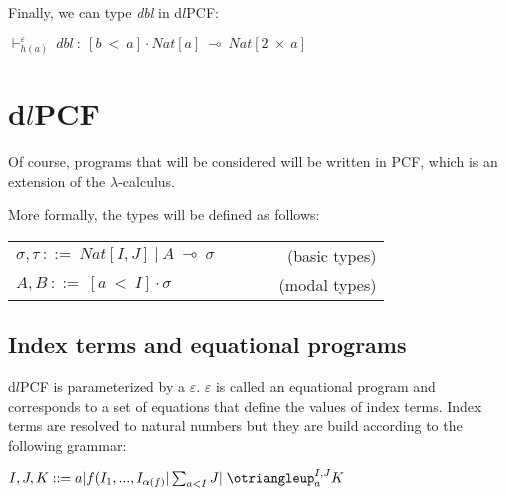 \documentclass[a4paper,12pt]{article}
\begin{document}
Finally, we can type \emph{dbl} in d$l$PCF:

\begin{center}
$\vdash^{\varepsilon}_{h(a)}~dbl~:~[b~<~a] \cdot Nat[a]~\multimap~Nat[2~\times~a]$
\end{center}

\section{d$l$PCF}


Of course, programs that will be considered will be written in PCF, which is an
extension of the $\lambda$-calculus. 

More formally, the types will be defined as follows:

\begin{center}
  \begin{tabular}{l c r}
    $\sigma, \tau~::=~Nat[I,J]~|~A~\multimap~\sigma$ & ~~~~ & (basic types) \\
    $A, B~::=~[a~<~I] \cdot \sigma$ & ~~~~ & (modal types)
  \end{tabular}
\end{center}

\subsection{Index terms and equational programs}

d$l$PCF is parameterized by a $\varepsilon$. $\varepsilon$ is called an equational
program and corresponds to a set of equations that define the values of index 
terms. Index terms are resolved to natural numbers but they are build according to 
the following grammar:

\begin{center}
$I,J,K::= a | f(I_{1},...,I_{\alpha(f)} | \sum_{a<I} J |\;\otriangleup_{a}^{I,J}K $
\end{center}
\end{document}

